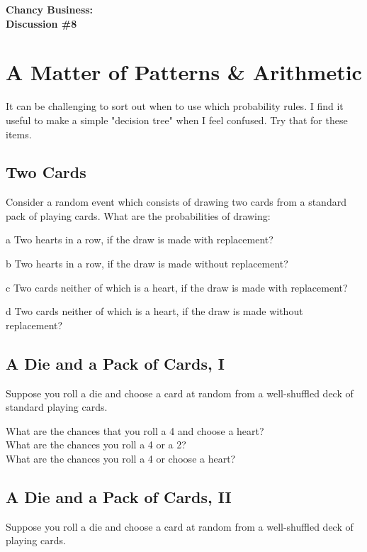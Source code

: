 \documentclass[12pt]{amsart}
\theoremstyle{definition}
\begin{document}
\begin{center}
\textbf{\Huge
Chancy Business:\\ Discussion \#8
}
\end{center}


\vspace{.25in}

\section*{A Matter of Patterns \& Arithmetic}

It can be challenging to sort out when to use which probability rules. I find it useful to make a simple "decision tree" when I feel confused. Try that for these items.


 \subsection*{Two Cards}
Consider a random event which consists of drawing two cards from a standard pack of playing cards. What are the probabilities of drawing:
\begin{compactdesc}
\item[a] Two hearts in a row, if the draw is made with replacement?
\item[b] Two hearts in a row, if the draw is made without replacement?
\item[c] Two cards neither of which is a heart, if the draw is made with replacement?
\item[d] Two cards neither of which is a heart, if the draw is made without replacement?
\end{compactdesc}




\subsection*{A Die and a Pack of Cards, I}
Suppose you roll a die and choose a card at random from a well-shuffled deck of standard playing cards.

What are the chances that you roll a 4 and choose a heart?\\

What are the chances you roll a 4 or a 2?\\

What are the chances you roll a 4 or choose a heart?\\

\subsection*{A Die and a Pack of Cards, II} Suppose you roll a die and choose a card at random from a well-shuffled deck of playing cards. 
\end{document}

